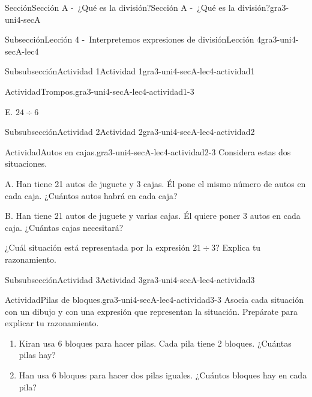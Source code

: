 \documentclass[twoside,14pt,]{extarticle}
\begin{document}
\begin{sectionptx}{Sección}{Sección A -~¿Qué es la división?}{}{Sección A -~¿Qué es la división?}{}{}{gra3-uni4-secA}
\begin{subsectionptx}{Subsección}{Lección 4 -~Interpretemos expresiones de división}{}{Lección 4}{}{}{gra3-uni4-secA-lec4}
\begin{subsubsectionptx}{Subsubsección}{Actividad 1}{}{Actividad 1}{}{}{gra3-uni4-secA-lec4-actividad1}
\begin{activity}{Actividad}{Trompos.}{gra3-uni4-secA-lec4-actividad1-3}
\begin{sidebyside}{2}{0.05}{0}{0.15}
\begin{sbspanel}{0.2}%
\par
E. \(24 \div 6\)%
\end{sbspanel}%
\end{sidebyside}%
\end{activity}%
\end{subsubsectionptx}
%
%
\typeout{************************************************}
\typeout{************************************************}
%
\begin{subsubsectionptx}{Subsubsección}{Actividad 2}{}{Actividad 2}{}{}{gra3-uni4-secA-lec4-actividad2}
\begin{activity}{Actividad}{Autos en cajas.}{gra3-uni4-secA-lec4-actividad2-3}%
Considera estas dos situaciones.%
\begin{sidebyside}{2}{0.05}{0.05}{0.1}%
\begin{sbspanel}{0.4}%
A. Han tiene 21 autos de juguete y 3 cajas. Él pone el mismo número de autos en cada caja. ¿Cuántos autos habrá en cada caja?%
\end{sbspanel}%
\begin{sbspanel}{0.4}%
\par
B. Han tiene 21 autos de juguete y varias cajas. Él quiere poner 3 autos en cada caja. ¿Cuántas cajas necesitará?%
\end{sbspanel}%
\end{sidebyside}%
\par
¿Cuál situación está representada por la expresión \(21\div 3\)? Explica tu razonamiento.%
\end{activity}%
\end{subsubsectionptx}
%
%
\typeout{************************************************}
\typeout{************************************************}
%
\begin{subsubsectionptx}{Subsubsección}{Actividad 3}{}{Actividad 3}{}{}{gra3-uni4-secA-lec4-actividad3}
\begin{activity}{Actividad}{Pilas de bloques.}{gra3-uni4-secA-lec4-actividad3-3}%
Asocia cada situación con un dibujo y con una expresión que representan la situación. Prepárate para explicar tu razonamiento.%
%
\begin{enumerate}
\item{}Kiran usa 6 bloques para hacer pilas. Cada pila tiene 2 bloques. ¿Cuántas pilas hay?%
\item{}Han usa 6 bloques para hacer dos pilas iguales. ¿Cuántos bloques hay en cada pila?%

\end{enumerate}
\end{activity}
\end{subsubsectionptx}
\end{subsectionptx}
\end{sectionptx}
\end{document}
